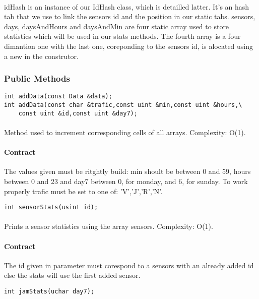 \documentclass[a4paper, 12pts]{article}
\begin{document}
\paragraph{}
	idHash is an instance of our IdHash class, which is detailled latter. It's an hash tab that we use to link the sensors id and the position in our static tabs.
	sensors, days, daysAndHours and daysAndMin are four static array used to store statistics which will be used in our stats methods. The fourth array is a four dimantion one with the last one, coreponding to the sensors id, is alocated using a new in the construtor.

\subsubsection{Public Methods}

\begin{lstlisting}
int addData(const Data &data);
int addData(const char &trafic,const uint &min,const uint &hours,\
	const uint &id,const uint &day7);
\end{lstlisting}
\paragraph{}
	Method used to increment corresponding cells of all arrays. Complexity: O(1).
\paragraph{Contract}
	The values given must be ritghtly build: min shoult be between 0 and 59, hours between 0 and 23 and day7 between 0, for monday, and 6, for sunday. To work properly trafic must be set to one of: 'V','J','R','N'.
	
\begin{lstlisting}
int sensorStats(usint id);
\end{lstlisting}
\paragraph{}
	Prints a sensor statistics using the array sensors. Complexity: O(1).
\paragraph{Contract}
	The id given in parameter must corespond to a sensors with an already added id else the stats will use the first added sensor.

\begin{lstlisting}
int jamStats(uchar day7);
\end{lstlisting}
\end{document}
